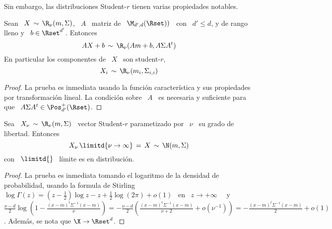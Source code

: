 Sin embargo, las distribuciones Student-$r$ tienen varias propiedades notables.

\begin{lema}
\label{Lem:MP:StabilidadLinealStudentR}
%
  Sean \ $X \, \sim \,  \R_\nu(m,\Sigma)$, \ $A$ \ matriz de \ $\M_{d',d}(\Rset))$
  \ con \ $d' \le d$, y de rango lleno y \ $b \in \Rset^{d'}$. Entonces
  \[
  A X + b\, \sim \, \R_\nu( A m + b , A \Sigma A^t)
  \]
  En particular los componentes de \ $X$ \ son student-$r$,
  \[
  X_i \, \sim \, \R_\nu(m_i , \Sigma_{i,i} )
  \]
\end{lema}
\begin{proof}
  La prueba es inmediata usando  la funci\'on caracter\'istica y sus propiedades
  por  transformaci\'on lineal.  La condici\'on  sobre \  $A$ \  es  necesaria y
  suficiente para que \ $A \Sigma A^t \in \Pos_{d'}^+(\Rset)$.
\end{proof}

\begin{lema}
\label{Lem:MP:LimiteStudentRGaussiana}
%
  Sea \  $X_\nu \, \sim  \, \R_\nu(m,\Sigma)$ \ vector  Student-$r$ parametizado
  por \ $\nu$ \ su grado de libertad. Entonces
  \[
  X_\nu \, \limitd{\nu \to \infty} \, = \, X \, \sim \, \N(m,\Sigma)
  \]
  con \ $\displaystyle \limitd{}$ \ l\'imite es en distribuci\'on.
\end{lema}
\begin{proof}
  La prueba  es inmediata tomando el  logaritmo de la  densidad de probabilidad,
  usando la  formula de Stirling \  $\log\Gamma(z) = \left( z  - \frac12 \right)
  \log z - z  + \frac12 \log(2 \pi) + o(1)$ \  en \ $z \to +\infty$~\cite{Sti30,
    AbrSte70,  GraRyz15} \  y \  $\frac{\nu-d}{2} \log\left(  1  - \frac{(x-m)^t
      \Sigma^{-1} (x-m)}{\nu}  \right) = -  \frac{\nu-d}{2} \left( \frac{(x-m)^t
      \Sigma^{-1}  (x-m)}{\nu+2}   +  o\left(  \nu^{-1}  \right)   \right)  =  -
  \frac{(x-m)^t \Sigma^{-1}  (x-m)}{2} +  o(1)$. Adem\'as, se  nota que  $\X \to
  \Rset^d$.
\end{proof}

